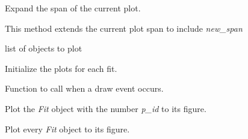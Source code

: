 \documentclass[a4paper,10pt,english]{sphinxmanual}
\begin{document}
\begin{fulllineitems}
\begin{fulllineitems}
\end{fulllineitems}


\begin{fulllineitems}
\label{index:kafe.plot.Plot.extend_span}
Expand the span of the current plot.

This method extends the current plot span to include \emph{new\_span}

\end{fulllineitems}


\begin{fulllineitems}
\label{index:kafe.plot.Plot.fits}
list of  objects to plot

\end{fulllineitems}


\begin{fulllineitems}
\label{index:kafe.plot.Plot.init_plots}
Initialize the plots for each fit.

\end{fulllineitems}


\begin{fulllineitems}
\label{index:kafe.plot.Plot.on_draw}
Function to call when a draw event occurs.

\end{fulllineitems}


\begin{fulllineitems}
\label{index:kafe.plot.Plot.plot}
Plot the \emph{Fit} object with the number \emph{p\_id} to its figure.

\end{fulllineitems}


\begin{fulllineitems}
\label{index:kafe.plot.Plot.plot_all}
Plot every \emph{Fit} object to its figure.


\end{fulllineitems}
\end{fulllineitems}
\end{document}
